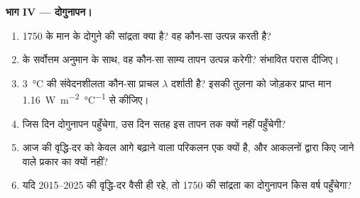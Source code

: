 \begin{problem}
\medskip
\noindent\textbf{भाग IV --- दोगुनापन।}
\begin{enumerate}[resume]
  \item 1750 के मान के दोगुने की सांद्रता क्या है? वह कौन-सा
         उत्पन्न करती है?
  \item {} के सर्वोत्तम अनुमान के साथ,
        वह कौन-सा साम्य तापन उत्पन्न करेगी? संभावित परास दीजिए।
  \item \qty{3}{\degreeCelsius} की संवेदनशीलता कौन-सा  प्राचल $\lambda$
        दर्शाती है? इसकी तुलना  को जोड़कर प्राप्त मान
        \qty{1.16}{W.m^{-2}.\degreeCelsius^{-1}} से
        कीजिए।
  \item जिस दिन दोगुनापन पहुँचेगा, उस दिन सतह इस तापन तक क्यों नहीं
        पहुँचेगी?
  \item आज की वृद्धि-दर को केवल आगे बढ़ाने वाला परिकलन एक
         क्यों है, और आकलनों द्वारा किए जाने वाले प्रकार का  क्यों नहीं?
  \item यदि 2015--2025 की वृद्धि-दर वैसी ही रहे, तो 1750 की सांद्रता का
        दोगुनापन किस वर्ष पहुँचेगा?
\end{enumerate}
\end{problem}
